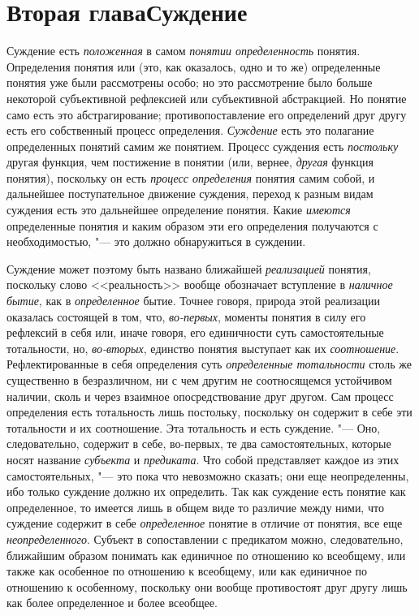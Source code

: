 \chapter[Вторая глава Суждение]{Вторая глава\newline Суждение}
Суждение есть {\em положенная} в самом {\em понятии определенность}
понятия. Определения понятия или (это, как оказалось, одно и
то же) определенные понятия уже были рассмотрены особо; но это рассмотрение
было больше некоторой субъективной рефлексией или субъективной абстракцией.
Но понятие само есть это абстрагирование; противопоставление его
определений друг другу есть его собственный процесс определения.
{\em Суждение} есть это
полагание определенных понятий самим же понятием. Процесс суждения есть
{\em постольку} другая функция, чем постижение в понятии (или, вернее,
{\em другая} функция понятия), поскольку он есть {\em процесс
определения} понятия самим собой, и дальнейшее
поступательное движение суждения, переход к разным видам
суждения есть это дальнейшее определение понятия. Какие {\em имеются}
определенные понятия и каким образом эти его определения
получаются с необходимостью, "--- это должно обнаружиться в
суждении.

Суждение может поэтому быть названо ближайшей
{\em реализацией}
понятия, поскольку слово <<реальность>> вообще обозначает
вступление в {\em наличное бытие},
как в {\em определенное}
бытие. Точнее говоря, природа этой реализации оказалась
состоящей в том, что, {\em во-первых},
моменты понятия в силу его рефлексий в себя или, иначе
говоря, его единичности суть самостоятельные тотальности, но,
{\em во-вторых}, единство понятия выступает как их {\em соотношение}.
Рефлектированные в себя определения суть
{\em определенные тотальности}
столь же существенно в безразличном, ни с чем другим не
соотносящемся устойчивом наличии, сколь и через взаимное опосредствование
друг другом. Сам процесс определения есть тотальность лишь постольку,
поскольку он содержит в себе эти тотальности и их соотношение. Эта
тотальность и есть суждение. "--- Оно, следовательно, содержит
в себе, во-первых, те два самостоятельных, которые носят название
{\em субъекта} и {\em предиката}. Что
собой представляет каждое из этих самостоятельных, "--- это
пока что невозможно сказать; они еще неопределенны, ибо только суждение
должно их определить. Так как суждение есть понятие как определенное, то
имеется лишь в общем виде то различие между ними, что суждение содержит в
себе {\em определенное}
понятие в отличие от понятия, все еще
{\em неопределенного}.
Субъект в сопоставлении с предикатом можно, следовательно,
ближайшим образом понимать как единичное по отношению ко всеобщему, или
также как особенное по отношению к всеобщему, или как единичное по
отношению к особенному, поскольку они вообще противостоят друг другу лишь
как более определенное и более всеобщее.

